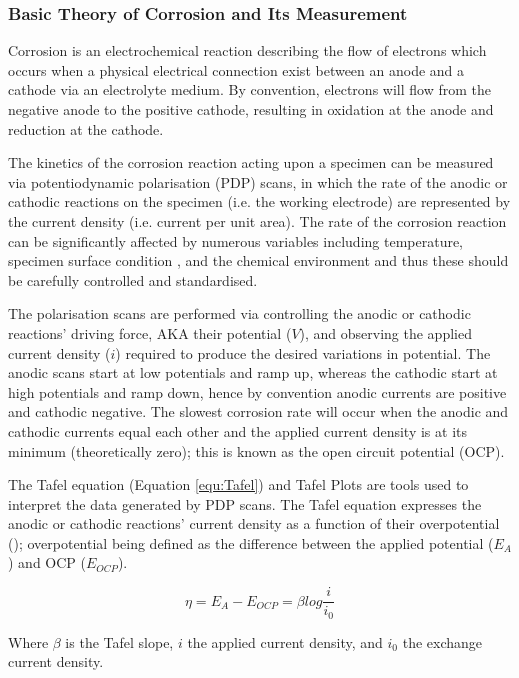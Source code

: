 \documentclass[a4paper,12pt,oneside]{report}%
\begin{document}
\subsubsection{Basic Theory of Corrosion and Its Measurement}
Corrosion is an electrochemical reaction describing the flow of electrons which occurs when a physical electrical connection exist between an anode and a cathode via an electrolyte medium. By convention, electrons will flow from the negative anode to the positive cathode, resulting in oxidation at the anode and reduction at the cathode. 

The kinetics of the corrosion reaction acting upon a specimen can be measured via potentiodynamic polarisation (PDP) scans, in which the rate of the anodic or cathodic reactions on the specimen (i.e. the working electrode) are represented by the current density (i.e. current per unit area). The rate of the corrosion reaction can be significantly affected by numerous variables including temperature, specimen surface condition \cite{Jones1992}, and the chemical environment and thus these should be carefully controlled and standardised. 

The polarisation scans are performed via controlling the anodic or cathodic reactions' driving force, AKA their potential ($V$), and observing the applied current density ($i$) required to produce the desired variations in potential. The anodic scans start at low potentials and ramp up, whereas the cathodic start at high potentials and ramp down, hence by convention anodic currents are positive and cathodic negative. The slowest corrosion rate will occur when the anodic and cathodic currents equal each other and the applied current density is at its minimum (theoretically zero); this is known as the open circuit potential (OCP). 

The Tafel equation (Equation \ref{equ:Tafel}) and Tafel Plots are tools used to interpret the data generated by PDP scans. The Tafel equation expresses the anodic or cathodic reactions' current density as a function of their overpotential (\n); overpotential being defined as the difference between the applied potential ($E_{A}$) and OCP ($E_{OCP}$).  

\begin{equation}
\eta = E_{A} - E_{OCP}=\beta log \frac{i}{i_{0}}
\label{equ:Tafel}
\end{equation}

Where $\beta$ is the Tafel slope, $i$ the applied current density, and $i_{0}$ the exchange current density. 
\end{document}
